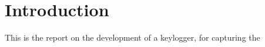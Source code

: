 \documentclass[a4paper,12pt]{article}
\begin{document}
	\maketitle
	
	\pagebreak
	
	\tableofcontents
	
	\pagebreak

	\section{Introduction}
	
	This is the report on the development of a keylogger, for capturing the 
	
\end{document}
